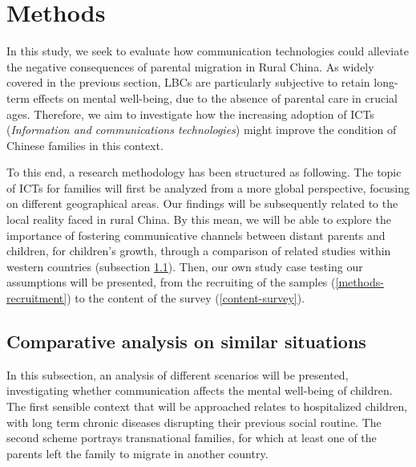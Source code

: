 \section{Methods}
\label{methods}


In this study, we seek to evaluate how communication technologies could alleviate the negative consequences of parental migration in Rural China. As widely covered in the previous section, LBCs are particularly subjective to retain long-term effects on mental well-being, due to the absence of parental care in crucial ages. Therefore, we aim to investigate how the increasing adoption of ICTs (\textit{Information and communications technologies}) might improve the condition of Chinese families in this context.

To this end, a research methodology has been structured as following. The topic of ICTs for families will first be analyzed from a more global perspective, focusing on different geographical areas. Our findings will be subsequently related to the local reality faced in rural China. By this mean, we will be able to explore the importance of fostering communicative channels between distant parents and children, for children's growth, through a comparison of related studies within western countries (subsection \ref{methods-compare}). Then, our own study case testing our assumptions will be presented, from the recruiting of the samples (\ref{methods-recruitment}) to the content of the survey (\ref{content-survey}).

\subsection{Comparative analysis on similar situations}
\label{methods-compare}

In this subsection, an analysis of different scenarios will be presented, investigating whether communication affects the mental well-being of children. The first sensible context that will be approached relates to hospitalized children, with long term chronic diseases disrupting their previous social routine. The second scheme portrays transnational families, for which at least one of the parents left the family to migrate in another country. 



